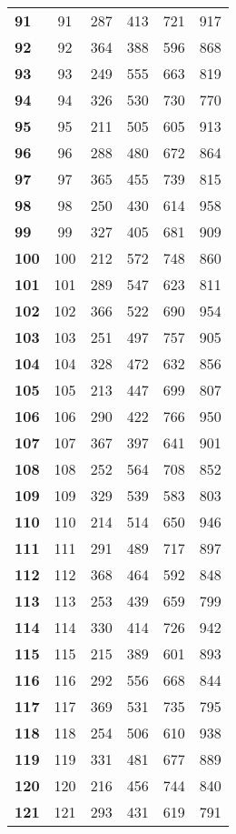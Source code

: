 \begin{longtable}{|l|c|c|c|c|c|}
  \textbf{91} & 91 &287 & 413 & 721 & 917 \\
  \textbf{92} & 92 &364 & 388 & 596 & 868 \\
  \textbf{93} & 93 &249 & 555 & 663 & 819 \\
  \textbf{94} & 94 &326 & 530 & 730 & 770 \\
  \textbf{95} & 95 &211 & 505 & 605 & 913 \\
  \textbf{96} & 96 &288 & 480 & 672 & 864 \\
  \textbf{97} & 97 &365 & 455 & 739 & 815 \\
  \textbf{98} & 98 &250 & 430 & 614 & 958 \\
  \textbf{99} & 99 &327 & 405 & 681 & 909 \\
  \textbf{100} & 100 &212 & 572 & 748 & 860 \\
  \textbf{101} & 101 &289 & 547 & 623 & 811 \\
  \textbf{102} & 102 &366 & 522 & 690 & 954 \\
  \textbf{103} & 103 &251 & 497 & 757 & 905 \\
  \textbf{104} & 104 &328 & 472 & 632 & 856 \\
  \textbf{105} & 105 &213 & 447 & 699 & 807 \\
  \textbf{106} & 106 &290 & 422 & 766 & 950 \\
  \textbf{107} & 107 &367 & 397 & 641 & 901 \\
  \textbf{108} & 108 &252 & 564 & 708 & 852 \\
  \textbf{109} & 109 &329 & 539 & 583 & 803 \\
  \textbf{110} & 110 &214 & 514 & 650 & 946 \\
  \textbf{111} & 111 &291 & 489 & 717 & 897 \\
  \textbf{112} & 112 &368 & 464 & 592 & 848 \\
  \textbf{113} & 113 &253 & 439 & 659 & 799 \\
  \textbf{114} & 114 &330 & 414 & 726 & 942 \\
  \textbf{115} & 115 &215 & 389 & 601 & 893 \\
  \textbf{116} & 116 &292 & 556 & 668 & 844 \\
  \textbf{117} & 117 &369 & 531 & 735 & 795 \\
  \textbf{118} & 118 &254 & 506 & 610 & 938 \\
  \textbf{119} & 119 &331 & 481 & 677 & 889 \\
  \textbf{120} & 120 &216 & 456 & 744 & 840 \\
  \textbf{121} & 121 &293 & 431 & 619 & 791 \\

\end{longtable}
